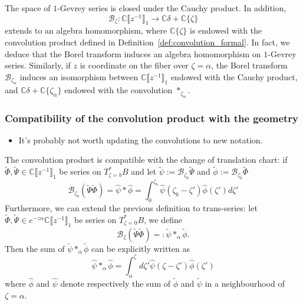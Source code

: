 \documentclass{article}
\newcommand{\C}{\mathbb{C}}
\newcommand{\series}[1]{\tilde{#1}}
\newcommand{\borel}{\mathcal{B}}
\theoremstyle{definition}
\theoremstyle{plain}
\newenvironment{verify}{\color{ForestGreen}}{\color{black}}
\newenvironment{brainstorm}{\color{BlueViolet}\begin{itemize}}{\end{itemize}\color{black}}
\begin{document}
The space of $1$-Gevrey series is closed under the Cauchy product. In addition, 
\[\borel_\zeta\colon\C\llbracket z^{-1}\rrbracket_1\to\C\delta + \C\{\zeta\}\]
extends to an algebra homomorphism, where $\C\{\zeta\}$ is endowed with the convolution product defined in Definition~\ref{def:convolution_formal}. In fact, we deduce that the Borel transform induces an algebra homomorphism on $1$-Gevrey series. Similarly, if $z$ is coordinate on the fiber over $\zeta=\alpha$, the Borel transform $\borel_{\zeta_\alpha}$ induces an isomorphism between $\C\llbracket z^{-1}\rrbracket_1$ endowed with the Cauchy product, and $\C\delta+\C\{\zeta_\alpha\}$ endowed with the convolution $\ast_{\zeta_\alpha}$.
\begin{verify}
\subsubsection{Compatibility of the convolution product with the geometry}\label{sec:convolution-compatible}
\begin{brainstorm}
\item It's probably not worth updating the convolutions to new notation.
\end{brainstorm}
The convolution product is compatible with the change of translation chart: if $\series{\Phi}, \series{\Psi}\in \C \llbracket z^{-1} \rrbracket_1$ be series on $T^*_{\zeta=b}B$ and let $\series{\psi}:=\borel_{\zeta_b}\series{\Psi}$ and $\series{\phi}:=\borel_{\zeta_b}\series{\Phi}$
\[\borel_{\zeta_b}(\series{\Psi}\series{\Phi})=\hat{\psi}\ast \hat{\phi}=\int_{0}^{\zeta_b}\hat{\psi}(\zeta_b-\zeta')\hat{\phi}(\zeta')d\zeta'\]
Furthermore, we can extend the previous definition to trans-series: let $\series{\Phi}, \series{\Psi}\in e^{-z\alpha}\C \llbracket z^{-1} \rrbracket_1$ be series on $T^*_{\zeta=0} B$, we define \[\borel_{\zeta}(\series{\Psi}\series{\Phi})=:\series{\psi}\ast_\alpha\series{\phi}.\]
Then the sum of $\series{\psi}\ast_\alpha\series{\phi}$ can be explicitly written as 
\begin{equation}
    \hat{\psi}\ast_\alpha\hat{\phi}=\int_\alpha^{\zeta}d\zeta' \hat{\psi}(\zeta-\zeta')\hat{\phi}(\zeta')
\end{equation}
where $\hat{\phi}$ and $\hat{\psi}$ denote respectively the sum of $\series{\phi}$ and $\series{\psi}$ in a neighbourhood of $\zeta=\alpha$. 


\end{verify}
\end{document}
